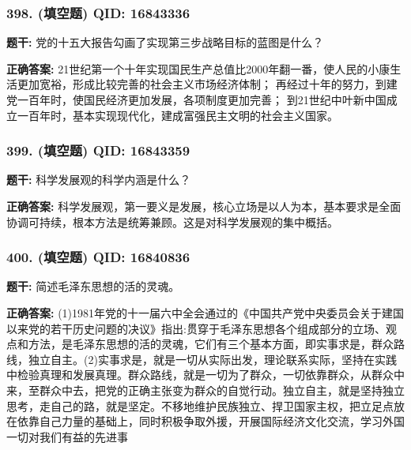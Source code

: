 \documentclass[12pt,UTF8]{ctexart}
\begin{document}
\vspace{0.3em}\hrulefill\vspace{0.7em}

\subsubsection*{398. (填空题) \small QID: 16843336}

\textbf{题干:}
党的十五大报告勾画了实现第三步战略目标的蓝图是什么？

\textbf{正确答案:}
21世纪第一个十年实现国民生产总值比2000年翻一番，使人民的小康生活更加宽裕，形成比较完善的社会主义市场经济体制；
再经过十年的努力，到建党一百年时，使国民经济更加发展，各项制度更加完善；
到21世纪中叶新中国成立一百年时，基本实现现代化，建成富强民主文明的社会主义国家。

\vspace{0.3em}\hrulefill\vspace{0.7em}

\subsubsection*{399. (填空题) \small QID: 16843359}

\textbf{题干:}
科学发展观的科学内涵是什么？

\textbf{正确答案:}
科学发展观，第一要义是发展，核心立场是以人为本，基本要求是全面协调可持续，根本方法是统筹兼顾。这是对科学发展观的集中概括。

\vspace{0.3em}\hrulefill\vspace{0.7em}

\subsubsection*{400. (填空题) \small QID: 16840836}

\textbf{题干:}
简述毛泽东思想的活的灵魂。

\textbf{正确答案:}
(1)1981年党的十一届六中全会通过的《中国共产党中央委员会关于建国以来党的若干历史问题的决议》指出:贯穿于毛泽东思想各个组成部分的立场、观点和方法，是毛泽东思想的活的灵魂，它们有三个基本方面，即实事求是，群众路线，独立自主。(2)实事求是，就是一切从实际出发，理论联系实际，坚持在实践中检验真理和发展真理。群众路线，就是一切为了群众，一切依靠群众，从群众中来，至群众中去，把党的正确主张变为群众的自觉行动。独立自主，就是坚持独立思考，走自己的路，就是坚定。不移地维护民族独立、捍卫国家主权，把立足点放在依靠自己力量的基础上，同时积极争取外援，开展国际经济文化交流，学习外国一切对我们有益的先进事
\end{document}
